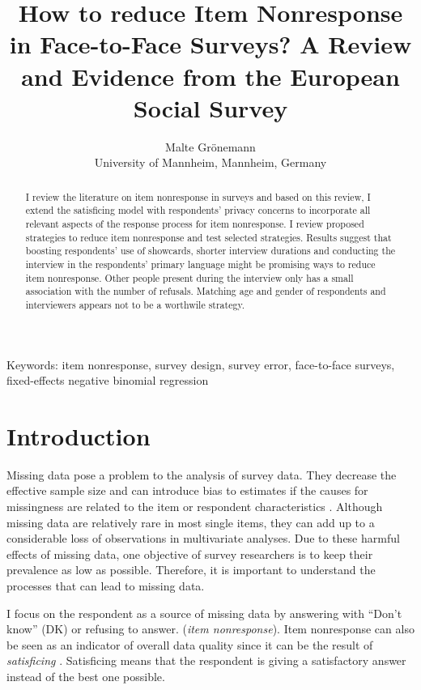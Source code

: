 \documentclass[a4paper,12pt]{article}
\title{How to reduce Item Nonresponse in Face-to-Face Surveys? A Review and Evidence from the European Social Survey}
\author{Malte Grönemann \\ University of Mannheim, Mannheim, Germany}
\begin{document}
\maketitle

\begin{abstract}
I review the literature on item nonresponse in surveys and based on this review, I extend the satisficing model with respondents' privacy concerns to incorporate all relevant aspects of the response process for item nonresponse. I review proposed strategies to reduce item nonresponse and test selected strategies. Results suggest that boosting respondents' use of showcards, shorter interview durations and conducting the interview in the respondents' primary language might be promising ways to reduce item nonresponse. Other people present during the interview only has a small association with the number of refusals. Matching age and gender of respondents and interviewers appears not to be a worthwile strategy.
\end{abstract}

Keywords: item nonresponse, survey design, survey error, face-to-face surveys, fixed-effects negative binomial regression

\section{Introduction}

Missing data pose a problem to the analysis of survey data. They decrease the effective sample size and can introduce bias to estimates if the causes for missingness are related to the item or respondent characteristics \citep{deleeuwPreventionTreatmentItem2003}. Although missing data are relatively rare in most single items, they can add up to a considerable loss of observations in multivariate analyses. Due to these harmful effects of missing data, one objective of survey researchers is to keep their prevalence as low as possible. Therefore, it is important to understand the processes that can lead to missing data.

I focus on the respondent as a source of missing data by answering with ``Don't know'' (DK) or refusing to answer. (\textit{item nonresponse}). Item nonresponse can also be seen as an indicator of overall data quality since it can be the result of \textit{satisficing} \citep{krosnickResponseStrategiesCoping1991}. Satisficing means that the respondent is giving a satisfactory answer instead of the best one possible.
\end{document}
